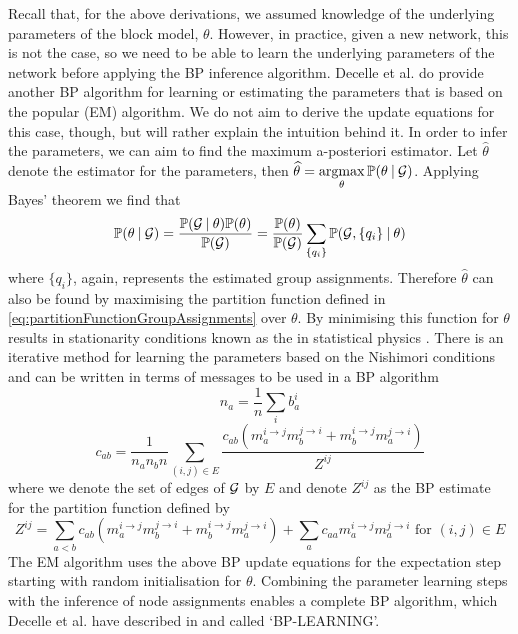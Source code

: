 Recall that, for the above derivations, we assumed knowledge of the underlying parameters of the block model, $\theta$.
However, in practice, given a new network, this is not the case, so we need to be able to learn the underlying parameters of the network before applying the BP inference algorithm.
Decelle et al. \cite{DKM+13} do provide another BP algorithm for learning or estimating the parameters that is based on the popular  (EM) algorithm.
We do not aim to derive the update equations for this case, though, but will rather explain the intuition behind it.
In order to infer the parameters, we can aim to find the maximum a-posteriori estimator.
Let $\widehat{\theta}$ denote the estimator for the parameters, then $\widehat{\theta} = \argmax_{\theta} \probability{\theta \given \graphvar{G}}$.
Applying Bayes' theorem we find that
\begin{equation}
	\label{eq:inferenceParametersBayesTheorem}
	\mathbb{P}(\theta \:\lvert\: \mathcal G) = \frac{\mathbb{P}(\mathcal G \:\lvert\: \theta) \mathbb{P}(\theta)}{\mathbb{P}(\mathcal G)} = \frac{\mathbb{P}(\theta)}{\mathbb{P}(\mathcal G)} \sum_{\{ q_{i} \}} \mathbb{P}(\mathcal G,\{q_{i}\} \:\lvert\: \theta) 
\end{equation}
where $\{ q_{i} \}$, again, represents the estimated group assignments.
Therefore $\widehat{\theta}$ can also be found by maximising the partition function defined in \cref{eq:partitionFunctionGroupAssignments} over $\theta$.
By minimising this function for $\theta$ results in stationarity conditions known as the  in statistical physics \cite{DKM+13}.
There is an iterative method for learning the parameters based on the Nishimori conditions and can be written in terms of messages to be used in a BP algorithm
\begin{equation}
	\label{eq:inferenceParametersBPMessage1}
	n_{a} = \frac{1}{n} \sum_{i} b_{a}^{i}
\end{equation}
\begin{equation}
	\label{eq:inferenceParametersBPMessage2}
	c_{ab} = \frac{1}{n_{a} n_{b} n} \sum_{(i,j) \in E} \frac{c_{ab} (m_{a}^{i \rightarrow j}m_{b}^{j \rightarrow i} + m_{b}^{i \rightarrow j}m_{a}^{j \rightarrow i})}{Z^{ij}}
\end{equation}
where we denote the set of edges of $\mathcal G$ by $E$ and denote $Z^{ij}$ as the BP estimate for the partition function defined by
\begin{equation}
	\label{eq:partitionFunctionBPEstimate}
	Z^{ij} = \sum_{a<b} c_{ab} (m_{a}^{i \rightarrow j}m_{b}^{j \rightarrow i} + m_{b}^{i \rightarrow j}m_{a}^{j \rightarrow i}) + \sum_{a} c_{aa} m_{a}^{i \rightarrow j} m_{a}^{j \rightarrow i} \text{ for } (i,j) \in E
\end{equation}
The EM algorithm uses the above BP update equations for the expectation step starting with random initialisation for $\theta$.
Combining the parameter learning steps with the inference of node assignments enables a complete BP algorithm, which Decelle et al. have described in \cite{DKM+13} and called `\textsc{BP-LEARNING}'.


